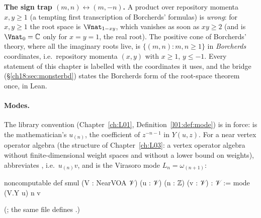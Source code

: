 \begin{warning}
\textbf{The sign trap $(m,n)\leftrightarrow(m,-n)$.}  A product over repository momenta
$x,y\ge1$ (a tempting first transcription of Borcherds' formulas) is \emph{wrong}: for $x,y\ge 1$ the root space is $\Vnat_{1-xy}$, which vanishes as soon as
$xy\ge2$ (and is $\Vnat_0=\mathbb C$ only for $x=y=1$, the real root).  The positive cone of
Borcherds' theory, where all the imaginary roots live, is $\{(m,n):m,n\ge1\}$ in \emph{Borcherds}
coordinates, i.e.\ repository momenta $(x,y)$ with $x\ge1$, $y\le-1$.  Every statement of this
chapter is labelled with the coordinates it uses, and the bridge 
(\S\ref{ch18:sec:monsterbd}) states the Borcherds form of the root-space theorem once, in Lean.
\end{warning}

\paragraph{Modes.}  The library convention  (Chapter~\ref{ch:L01},
Definition~\ref{l01:def:mode}) is in force:  is the mathematician's $u_{(n)}$, the
coefficient of $z^{-n-1}$ in $Y(u,z)$.  For a near vertex operator algebra  (the structure
 of Chapter~\ref{ch:L03}: a vertex operator algebra without finite-dimensional
weight spaces and without a lower bound on weights),  abbreviates
, i.e.\ $u_{(n)}v$, and  is the Virasoro mode
$L_n=\omega_{(n+1)}$:
\begin{leancode}
noncomputable def smul (V : NearVOA 𝒱) (u : 𝒱) (n : ℤ) (v : 𝒱) : 𝒱 := mode (V.Y u) n v
\end{leancode}
(; the same file defines .)

